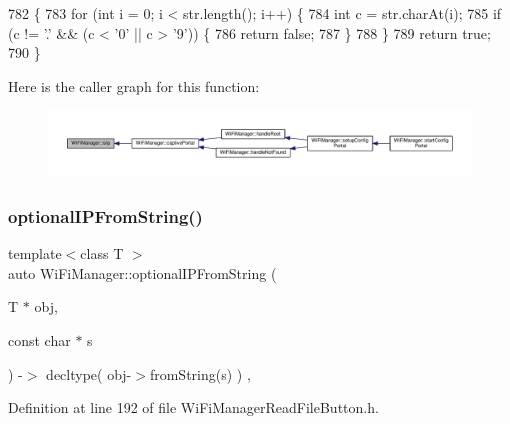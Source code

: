 \begin{DoxyCode}
782                                     \{
783   \textcolor{keywordflow}{for} (\textcolor{keywordtype}{int} i = 0; i < str.length(); i++) \{
784     \textcolor{keywordtype}{int} c = str.charAt(i);
785     \textcolor{keywordflow}{if} (c != \textcolor{charliteral}{'.'} && (c < '0' || c > \textcolor{charliteral}{'9'})) \{
786       \textcolor{keywordflow}{return} \textcolor{keyword}{false};
787     \}
788   \}
789   \textcolor{keywordflow}{return} \textcolor{keyword}{true};
790 \}
\end{DoxyCode}
Here is the caller graph for this function\+:\nopagebreak
\begin{figure}[H]
\begin{center}
\leavevmode
\includegraphics[width=350pt]{d4/dc8/class_wi_fi_manager_a9c78a8774f746ec22a99d03a53baa607_icgraph}
\end{center}
\end{figure}
\mbox{\label{class_wi_fi_manager_a6a94f08eb43e0871932556a4ccfa11b7}} 
\subsubsection{\texorpdfstring{optional\+I\+P\+From\+String()}{optionalIPFromString()}\hspace{0.1cm}{\footnotesize\ttfamily [1/2]}}
{\footnotesize\ttfamily template$<$class T $>$ \\
auto Wi\+Fi\+Manager\+::optional\+I\+P\+From\+String (\begin{DoxyParamCaption}\item[{T $\ast$}]{obj,  }\item[{const char $\ast$}]{s }\end{DoxyParamCaption}) -\/$>$ decltype(  obj-\/$>$from\+String(s)  ) \hspace{0.3cm}{\ttfamily [inline]}, {\ttfamily [private]}}



Definition at line 192 of file Wi\+Fi\+Manager\+Read\+File\+Button.\+h.


